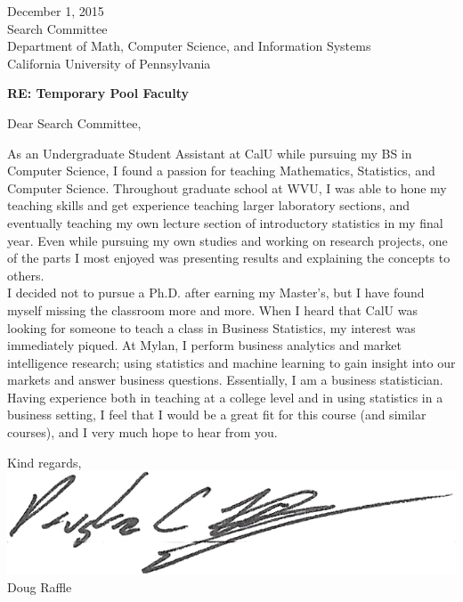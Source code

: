 \documentclass[letterpaper]{deedy-resume} %
\begin{document}




\begin{flushleft}
December 1, 2015\\
\vspace{10pt}
Search Committee\\
Department of Math, Computer Science, and Information Systems\\
California University of Pennsylvania

\sectionspace

{\bf RE: Temporary Pool Faculty}\\

\sectionspace
\sectionspace

Dear Search Committee,

\sectionspace

As an Undergraduate Student Assistant at CalU while pursuing my BS in
Computer Science, I found a passion for teaching Mathematics,
Statistics, and Computer Science. Throughout graduate school at WVU, I
was able to hone my teaching skills and get experience teaching larger
laboratory sections, and eventually teaching my own lecture
section of introductory statistics in my final year. Even while
pursuing my own studies and working on research projects, one of the
parts I most enjoyed was presenting results and explaining the
concepts to others.\\ 
\sectionspace
I decided not to pursue a Ph.D. after earning my Master's, but I have
found myself missing the classroom more and more.  When I heard that CalU was
looking for someone to teach a class in Business Statistics, my
interest was immediately piqued.  At Mylan, I perform business
analytics and market intelligence research; using 
statistics and machine learning to gain insight into our markets and
answer business questions.  Essentially, I am a business statistician.\\
\sectionspace
Having experience both in teaching at a college level and in
using statistics in a business setting, I feel that I would be a great
fit for this course (and similar courses), and I very much hope to
hear from you. 


\vspace{250pt}
\begin{minipage}{5cm}
Kind regards,\\
\includegraphics{signature2}
Doug Raffle
\end{minipage}

\end{flushleft}
\end{document}
